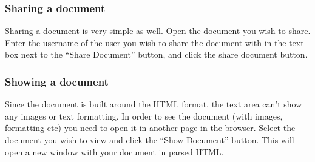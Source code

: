 \documentclass[11pt]{article}
\begin{document}
\subsubsection{Sharing a document}
\label{sec-1-2-3}

    Sharing a document is very simple as well.
    Open the document you wish to share. Enter the username of the user you wish to share the document with in
    the text box next to the ``Share Document'' button, and click the share document button.
\subsubsection{Showing a document}
\label{sec-1-2-4}

    Since the document is built around the HTML format, the text area can't show any images or text formatting.
    In order to see the document (with images, formatting etc) you need to open it in another page in the 
    browser.
    Select the document you wish to view and click the ``Show Document'' button. This will open a new window 
    with your document in parsed HTML.
\end{document}
